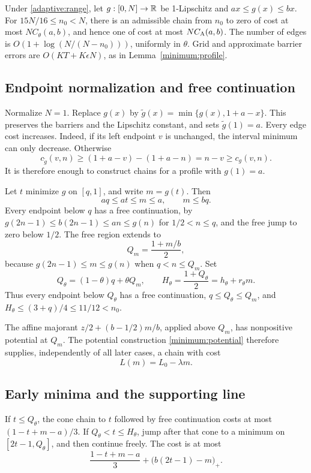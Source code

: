 \begin{lemma}\label{adaptive:profile}
Under \eqref{adaptive:range}, let \(g:[0,N]\to\mathbb R\) be 1-Lipschitz and
\(ax\le g(x)\le bx\). For \(15N/16\le n_0<N\), there is an admissible
chain from \(n_0\) to zero of cost at most \(NC_\theta(a,b)\), and hence
one of cost at most \(NC_{\rm A}(a,b)\). The number of edges is
\(O(1+\log(N/(N-n_0)))\), uniformly in \(\theta\). Grid and approximate
barrier errors are \(O(KT+K\epsilon N)\), as in Lemma~\ref{minimum:profile}.
\end{lemma}

\subsection{Endpoint normalization and free continuation}
Normalize \(N=1\). Replace \(g(x)\) by
\(\widetilde g(x)=\min\{g(x),1+a-x\}\). This preserves the barriers
and the Lipschitz constant, and sets \(\widetilde g(1)=a\). Every edge
cost increases. Indeed, if its left endpoint \(v\) is unchanged, the
interval minimum can only decrease. Otherwise
\[
 c_{\widetilde g}(v,n)\ge(1+a-v)-(1+a-n)=n-v\ge c_g(v,n).
\]
It is therefore enough to construct chains for a profile with \(g(1)=a\).

Let \(t\) minimize \(g\) on \([q,1]\), and write \(m=g(t)\). Then
\begin{equation}\label{adaptive:minimum-bounds}
 aq\le at\le m\le a,\qquad m\le bq.
\end{equation}
Every endpoint below \(q\) has a free continuation, by
\(g(2n-1)\le b(2n-1)\le an\le g(n)\) for \(1/2<n\le q\),
and the free jump to zero below \(1/2\). The free region extends to
\[
 Q_m=\frac{1+m/b}{2},
\]
because \(g(2n-1)\le m\le g(n)\) when \(q<n\le Q_m\).
Set
\[
 Q_\theta=(1-\theta)q+\theta Q_m,
 \qquad H_\theta=\frac{1+Q_\theta}{2}=h_\theta+r_\theta m.
\]
Thus every endpoint below \(Q_\theta\) has a free continuation,
\(q\le Q_\theta\le Q_m\), and
\(H_\theta\le(3+q)/4\le11/12<n_0\).

The affine majorant \(z/2+(b-1/2)m/b\), applied above \(Q_m\),
has nonpositive potential at \(Q_m\). The potential construction
\eqref{minimum:potential} therefore supplies, independently of all later
cases, a chain with cost
\begin{equation}\label{adaptive:floor}
 L(m)=L_0-\lambda m.
\end{equation}

\subsection{Early minima and the supporting line}
If \(t\le Q_\theta\), the cone chain to \(t\) followed by free
continuation costs at most \((1-t+m-a)/3\). If
\(Q_\theta<t\le H_\theta\), jump after that cone to a minimum on
\([2t-1,Q_\theta]\), and then continue freely. The cost is at most
\begin{equation}\label{adaptive:early-route}
 \frac{1-t+m-a}{3}+\bigl(b(2t-1)-m\bigr)_+.
\end{equation}

